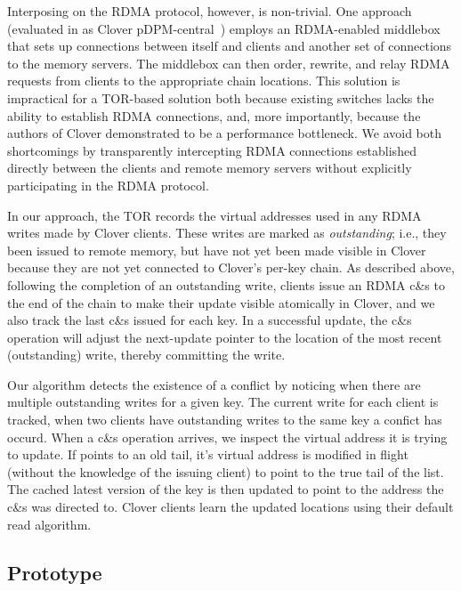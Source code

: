 Interposing on the RDMA protocol, however, is non-trivial. One
approach (evaluated in as Clover pDPM-central~\cite{clover}) employs
an RDMA-enabled middlebox that sets up connections between itself and
clients and another set of connections to the memory servers.  The
middlebox can then order, rewrite, and relay RDMA requests from
clients to the appropriate chain locations. This solution is
impractical for a TOR-based solution both because existing switches
lacks the ability to establish RDMA connections, and, more
importantly, because the authors of Clover demonstrated to be a
performance bottleneck.  We avoid both shortcomings by transparently
intercepting RDMA connections established directly between the clients
and remote memory servers without explicitly participating in the RDMA
protocol.

In our approach, the TOR records the virtual addresses used in any
RDMA writes made by Clover clients. These writes are marked as
\textit{outstanding}; i.e., they been issued to remote memory, but
have not yet been made visible in Clover because they are not yet
connected to Clover's per-key chain.  As described above, following
the completion of an outstanding write, clients issue an RDMA c\&s to
the end of the chain to make their update visible atomically in Clover,
and we also track the last c\&s issued for each key.  In a successful
update, the c\&s operation will adjust the next-update pointer to the
location of the most recent (outstanding) write, thereby committing the
write.

  Our algorithm detects the existence of a conflict by noticing when
  there are multiple outstanding writes for a given key. The current
  write for each client is tracked, when two clients have outstanding
  writes to the same key a confict has occurd. When a c\&s operation
  arrives, we inspect the virtual address it is trying to update.  If
  points to an old tail, it's virtual address is modified in flight
  (without the knowledge of the issuing client) to point to the true
  tail of the list. The cached latest version of the key is then
  updated to point to the address the c\&s was directed to.  Clover
  clients learn the updated locations using their default read
  algorithm.

\subsection{Prototype}


